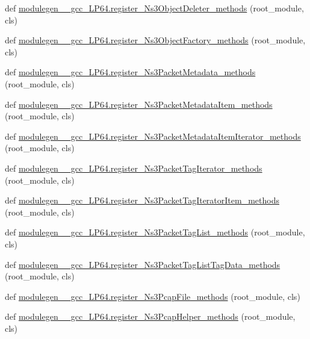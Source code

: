 \begin{DoxyCompactItemize}
\item 
def \hyperlink{namespacemodulegen____gcc__LP64_ae02c1fc1dc3e8ca9071dee347b82eae5}{modulegen\+\_\+\+\_\+gcc\+\_\+\+L\+P64.\+register\+\_\+\+Ns3\+Object\+Deleter\+\_\+methods} (root\+\_\+module, cls)
\item 
def \hyperlink{namespacemodulegen____gcc__LP64_a786202f6865813272a2645524e567a31}{modulegen\+\_\+\+\_\+gcc\+\_\+\+L\+P64.\+register\+\_\+\+Ns3\+Object\+Factory\+\_\+methods} (root\+\_\+module, cls)
\item 
def \hyperlink{namespacemodulegen____gcc__LP64_a1389373aaae60b11eca14fb1daaa350f}{modulegen\+\_\+\+\_\+gcc\+\_\+\+L\+P64.\+register\+\_\+\+Ns3\+Packet\+Metadata\+\_\+methods} (root\+\_\+module, cls)
\item 
def \hyperlink{namespacemodulegen____gcc__LP64_a2ac7c9819f0a71366e0cb996f16c2232}{modulegen\+\_\+\+\_\+gcc\+\_\+\+L\+P64.\+register\+\_\+\+Ns3\+Packet\+Metadata\+Item\+\_\+methods} (root\+\_\+module, cls)
\item 
def \hyperlink{namespacemodulegen____gcc__LP64_ad75a5ba1c89bf75f399491ebc4bc2299}{modulegen\+\_\+\+\_\+gcc\+\_\+\+L\+P64.\+register\+\_\+\+Ns3\+Packet\+Metadata\+Item\+Iterator\+\_\+methods} (root\+\_\+module, cls)
\item 
def \hyperlink{namespacemodulegen____gcc__LP64_a1d07a5663a331363a6765890f7c3f7ad}{modulegen\+\_\+\+\_\+gcc\+\_\+\+L\+P64.\+register\+\_\+\+Ns3\+Packet\+Tag\+Iterator\+\_\+methods} (root\+\_\+module, cls)
\item 
def \hyperlink{namespacemodulegen____gcc__LP64_af0346c019adfcbf415a97ec6cff465e1}{modulegen\+\_\+\+\_\+gcc\+\_\+\+L\+P64.\+register\+\_\+\+Ns3\+Packet\+Tag\+Iterator\+Item\+\_\+methods} (root\+\_\+module, cls)
\item 
def \hyperlink{namespacemodulegen____gcc__LP64_a96f93e9ac4cca72d9c82bad3ed221800}{modulegen\+\_\+\+\_\+gcc\+\_\+\+L\+P64.\+register\+\_\+\+Ns3\+Packet\+Tag\+List\+\_\+methods} (root\+\_\+module, cls)
\item 
def \hyperlink{namespacemodulegen____gcc__LP64_a5297a25e4d02fb34208dfd16709b500f}{modulegen\+\_\+\+\_\+gcc\+\_\+\+L\+P64.\+register\+\_\+\+Ns3\+Packet\+Tag\+List\+Tag\+Data\+\_\+methods} (root\+\_\+module, cls)
\item 
def \hyperlink{namespacemodulegen____gcc__LP64_ab491f7fd4edd40dff0ee1ef02dba0c2b}{modulegen\+\_\+\+\_\+gcc\+\_\+\+L\+P64.\+register\+\_\+\+Ns3\+Pcap\+File\+\_\+methods} (root\+\_\+module, cls)
\item 
def \hyperlink{namespacemodulegen____gcc__LP64_ad286cc7a6737b5e87b0793a24871902b}{modulegen\+\_\+\+\_\+gcc\+\_\+\+L\+P64.\+register\+\_\+\+Ns3\+Pcap\+Helper\+\_\+methods} (root\+\_\+module, cls)

\end{DoxyCompactItemize}
